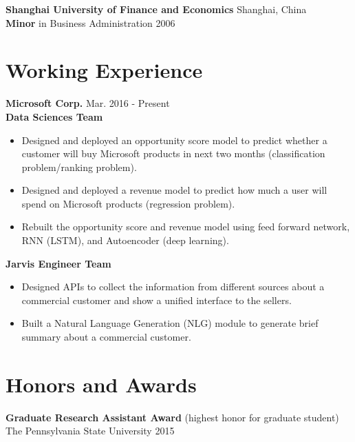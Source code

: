 \documentclass[margin,line]{res}
\begin{document}
\begin{resume}
{\bf Shanghai University of Finance and Economics} \hfill Shanghai, China \\
{{\bf Minor} in Business Administration} \hfill 2006

\section{\sc Working Experience}

{\bf Microsoft Corp. }  \hfill  Mar. 2016 - Present \\
{\bf Data Sciences Team}   \\
\begin{itemize}
  \item Designed and deployed an opportunity score model to predict whether a customer will buy Microsoft products in next two months (classification problem/ranking problem).
  \item Designed and deployed a revenue model to predict how much a user will spend on Microsoft products (regression problem).
  \item Rebuilt the opportunity score and revenue model using feed forward network, RNN (LSTM), and Autoencoder (deep learning).
\end{itemize}

{\bf Jarvis Engineer Team}   \\
\begin{itemize}
  \item Designed APIs to collect the information from different sources about a commercial customer and show a unified interface to the sellers.
  \item Built a Natural Language Generation (NLG) module to generate brief summary about a commercial customer.
\end{itemize}


%


\section{\sc Honors and Awards}
{\bf Graduate Research Assistant Award} (highest honor for graduate student)\\
The Pennsylvania State University \hfill {2015}
\vspace{-0.1in}


\end{resume}
\end{document}
